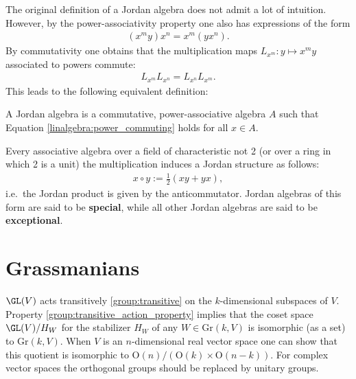     The original definition of a Jordan algebra does not admit a lot of intuition. However, by the power-associativity property one also has expressions of the form
    \begin{gather}
        (x^my)x^n = x^m(yx^n).
    \end{gather}
    By commutativity one obtains that the multiplication maps $L_{x^m}:y\mapsto x^my$ associated to powers commute:
    \begin{gather}
        \label{linalgebra:power_commuting}
        L_{x^m}L_{x^n} = L_{x^n}L_{x^m}.
    \end{gather}
    This leads to the following equivalent definition:
    \begin{adefinition}
        A Jordan algebra is a commutative, power-associative algebra $A$ such that Equation \eqref{linalgebra:power_commuting} holds for all $x\in A$.
    \end{adefinition}

    \begin{property}
        Every associative algebra over a field of characteristic not 2 (or over a ring in which 2 is a unit) the multiplication induces a Jordan structure as follows:
        \begin{gather}
            x\circ y := \frac{1}{2}(xy+yx),
        \end{gather}
        i.e.~the Jordan product is given by the anticommutator. Jordan algebras of this form are said to be \textbf{special}, while all other Jordan algebras are said to be \textbf{exceptional}.
    \end{property}

\section{Grassmanians}

    \begin{property}\label{linalgebra:grassmannian_construction}
        $\GL(V)$ acts transitively \ref{group:transitive} on the $k$-dimensional subspaces of $V$. Property \ref{group:transitive_action_property} implies that the coset space $\GL(V)/H_W$ for the stabilizer $H_W$ of any $W\in\mathrm{Gr}(k,V)$ is isomorphic (as a set) to $\mathrm{Gr}(k,V)$. When $V$ is an $n$-dimensional real vector space one can show that this quotient is isomorphic to $\mathrm{O}(n)/(\mathrm{O}(k)\times\mathrm{O}(n-k))$. For complex vector spaces the orthogonal groups should be replaced by unitary groups.
    \end{property}

